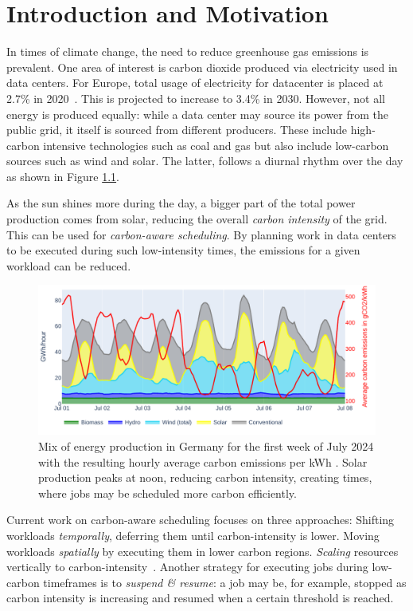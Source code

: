 \chapter{Introduction and Motivation}

In times of climate change, the need to reduce greenhouse gas emissions is prevalent. 
One area of interest is carbon dioxide produced via electricity used in data centers. 
For Europe, total usage of electricity for datacenter is placed at 2.7\% in 2020~.  
This is projected to increase to 3.4\% in 2030.
However, not all energy is produced equally: while a data center may source its power from the public grid, it itself is sourced from different producers. 
These include high-carbon intensive technologies such as coal and gas but also include low-carbon sources such as wind and solar. 
The latter, follows a diurnal rhythm over the day as shown in Figure \ref{fig:energy_mix}.

As the sun shines more during the day, a bigger part of the total power production comes from solar, reducing the overall \emph{carbon intensity} of the grid.
This can be used for \emph{carbon-aware scheduling}. 
By planning work in data centers to be executed during such low-intensity times, the emissions for a given workload can be reduced.
 
\begin{figure}[H] %
    \includegraphics[width=\linewidth]{agorameter/energy_production_week.pdf}
    \caption[short]{Mix of energy production in Germany for the first week of July 2024 with the resulting hourly average carbon emissions per kWh . Solar production peaks at noon, reducing carbon intensity, creating times, where jobs may be scheduled more carbon efficiently.}
    \label{fig:energy_mix}
\end{figure}

Current work on carbon-aware scheduling focuses on three approaches:
Shifting workloads \emph{temporally}, deferring them until carbon-intensity is lower.
Moving workloads \emph{spatially} by executing them in lower carbon regions.
\emph{Scaling} resources vertically to carbon-intensity~\cite{thiede_carbon_2023}.
Another strategy for executing jobs during low-carbon timeframes is to \emph{suspend \& resume}: a job may be, for example, stopped as carbon intensity is increasing and resumed when a certain threshold is reached. 


